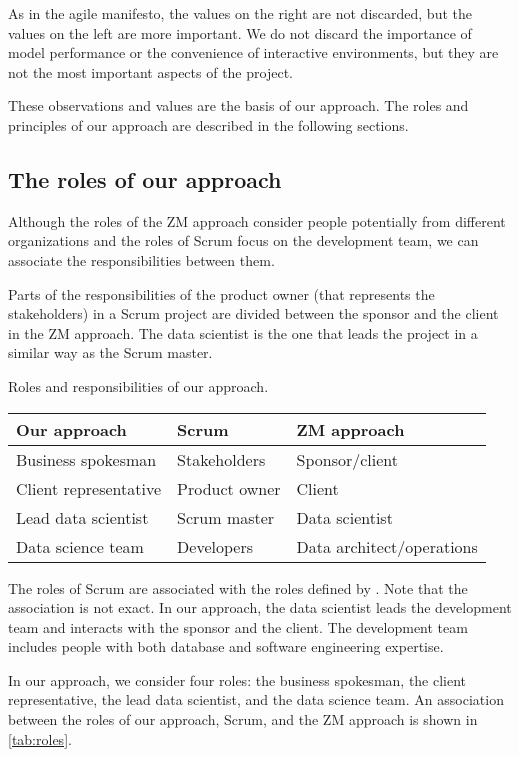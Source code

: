 As in the agile manifesto, the values on the right are not discarded, but the values on the
left are more important.  We do not discard the importance of model performance or the
convenience of interactive environments, but they are not the most important aspects of the
project.

These observations and values are the basis of our approach.  The roles and principles of
our approach are described in the following sections.

\subsection{The roles of our approach}

Although the roles of the ZM approach consider people potentially from different
organizations and the roles of Scrum focus on the development team, we can associate the
responsibilities between them.

Parts of the responsibilities of the product owner (that represents the stakeholders) in a
Scrum project are divided between the sponsor and the client in the ZM approach.  The data
scientist is the one that leads the project in a similar way as the Scrum master.

\begin{tablebox}[label=tab:roles]{Roles and responsibilities of our approach.}
  \centering
  \begin{tabular}{llp{2.5cm}}
    \toprule
    \textbf{Our approach} & \textbf{Scrum} & \textbf{ZM approach} \\
    \midrule
    Business spokesman & Stakeholders & Sponsor/client \\
    Client representative & Product owner & Client \\
    Lead data scientist & Scrum master & Data scientist \\
    Data science team & Developers & Data architect/operations \\
    \bottomrule
  \end{tabular}
  \tcblower
  The roles of Scrum are associated with the roles defined by \textcite{Zumel2019}.
  Note that the association is not exact.
  In our approach, the data scientist leads the development team and interacts with the sponsor
  and the client.  The development team includes people with both database and software
  engineering expertise.
\end{tablebox}

In our approach, we consider four roles: the business spokesman, the client representative,
the lead data scientist, and the data science team.  An association between the roles of
our approach, Scrum, and the ZM approach is shown in \cref{tab:roles}.

